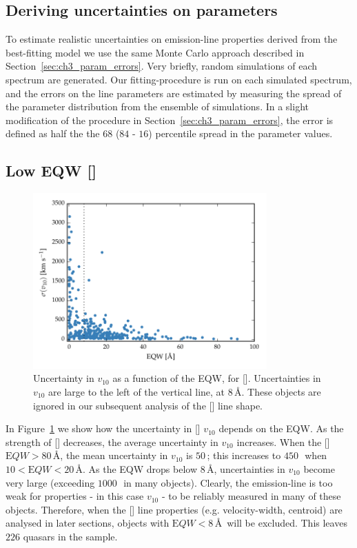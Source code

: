 \subsection{Deriving uncertainties on parameters}

To estimate realistic uncertainties on emission-line properties derived from the best-fitting model we use the same Monte Carlo approach described in Section~\ref{sec:ch3_param_errors}. 
Very briefly, random simulations of each spectrum are generated.
Our fitting-procedure is run on each simulated spectrum, and the errors on the line parameters are estimated by measuring the spread of the parameter distribution from the ensemble of simulations. 
In a slight modification of the procedure in Section~\ref{sec:ch3_param_errors}, the error is defined as half the the $68$ ($84$ - $16$) percentile spread in the parameter values. 

\subsection{Low EQW []}

\begin{figure}
    \centering
    \includegraphics[width=0.8\textwidth]{figures/chapter04/eqw_cut.pdf} 
    \caption[{Uncertainty in $v_{10}$ as a function of the EQW, for [].}]{Uncertainty in $v_{10}$ as a function of the EQW, for []. Uncertainties in $v_{10}$ are large to the left of the vertical line, at $8$\,\AA. These objects are ignored in our subsequent analysis of the [] line shape.}     
    \label{fig:eqw_cut}
\end{figure}

In Figure~\ref{fig:eqw_cut} we show how the uncertainty in [] $v_{10}$ depends on the EQW. 
As the strength of [] decreases, the average uncertainty in $v_{10}$ increases.
When the [] ${\mathrm EQW} > 80$\,\AA, the mean uncertainty in $v_{10}$ is $50$\,\kms; this increases to $450$\,\kms\, when $10 < {\mathrm EQW} < 20$\,\AA. 
As the EQW drops below $8$\,\AA, uncertainties in $v_{10}$ become very large (exceeding $1000$\,\kms\, in many objects). 
Clearly, the emission-line is too weak for properties - in this case $v_{10}$ - to be reliably measured in many of these objects. 
Therefore, when the [] line properties (e.g. velocity-width, centroid) are analysed in later sections, objects with ${\mathrm EQW} < 8$\,\AA\, will be excluded. 
This leaves $226$ quasars in the sample. 

